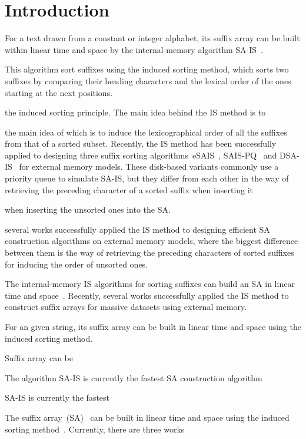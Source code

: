 \documentclass[10pt,journal,compsoc]{IEEEtran}
\begin{document}
\section{Introduction}\label{sec:introduction}

For a text drawn from a constant or integer alphabet, its suffix array can be built within linear time and space by the internal-memory algorithm SA-IS~\cite{Nong11}. 




This algorithm sort suffixes using the induced sorting method, which sorts two suffixes by comparing their heading characters and the lexical order of the ones starting at the next positions.


 the induced sorting principle. The  main idea behind the IS method is to 

 the main idea of which is to induce the lexicographical order of all the suffixes from that of a sorted subset. Recently, the IS method has been successfully applied to designing three suffix sorting algorithms~eSAIS~\cite{Bingmann12}, SAIS-PQ~\cite{Liu15} and DSA-IS~\cite{Nong15} for external memory models. These disk-based variants commonly use a priority queue to simulate SA-IS, but they differ from each other in the way of retrieving the preceding character of a sorted suffix when inserting it 

 when inserting the unsorted ones into the SA. 


several works successfully applied the IS method to designing efficient SA construction algorithms on external memory models, where the biggest difference between them is the way of retrieving the preceding characters of sorted suffixes for inducing the order of unsorted ones.


The internal-memory IS algorithms for sorting suffixes can build an SA in linear time and space~\cite{Nong11}. Recently, several works successfully applied the IS method to construct suffix arrays for massive datasets using external memory.

For an given string, its suffix array can be built in linear time and space using the induced sorting method.  


Suffix array can be 


The algorithm SA-IS is currently the fastest SA construction algorithm 

SA-IS is currently the fastest 


The suffix array~(SA)~\cite{Manber1993} can be built in linear time and space using the induced sorting method~\cite{Nong11}. Currently, there are three works  
\end{document}
